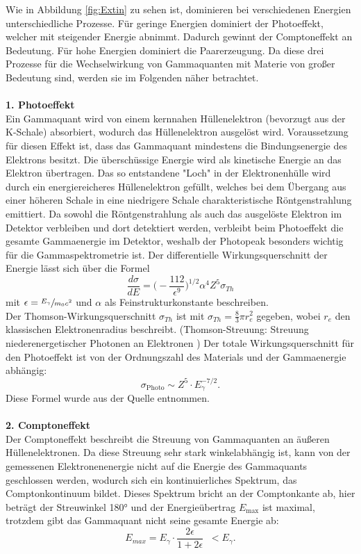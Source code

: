 Wie in Abbildung \ref{fig:Extin} zu sehen ist, dominieren bei verschiedenen Energien
unterschiedliche Prozesse. Für geringe Energien dominiert der Photoeffekt, welcher mit
steigender Energie abnimmt. Dadurch gewinnt der Comptoneffekt an Bedeutung. Für hohe
Energien dominiert die Paarerzeugung.
Da diese drei Prozesse für die Wechselwirkung von Gammaquanten mit Materie von großer Bedeutung sind,
werden sie im Folgenden näher betrachtet.
\\
\\
\textbf{1. Photoeffekt}\\
Ein Gammaquant wird von einem kernnahen Hüllenelektron (bevorzugt aus der K-Schale) absorbiert,
wodurch das Hüllenelektron ausgelöst wird. Voraussetzung für diesen Effekt ist, dass das Gammaquant
mindestens die Bindungsenergie des Elektrons besitzt. Die überschüssige Energie wird als kinetische
Energie an das Elektron übertragen.
Das so entstandene "Loch" in der Elektronenhülle wird durch ein energiereicheres Hüllenelektron
gefüllt, welches bei dem Übergang aus einer höheren Schale in eine niedrigere Schale
charakteristische Röntgenstrahlung emittiert.
Da sowohl die Röntgenstrahlung als auch das ausgelöste Elektron im Detektor verbleiben und
dort detektiert werden, verbleibt beim Photoeffekt die gesamte Gammaenergie im Detektor, weshalb
der Photopeak besonders wichtig für die Gammaspektrometrie ist.
Der differentielle Wirkungsquerschnitt der Energie lässt sich über die Formel
\begin{equation}
  \frac{d \sigma}{d E} = \bigg(-\frac{112}{\epsilon^{9}}\bigg)^{1/2}\alpha^4 Z^5\sigma_{Th}
  \label{eqn:diffPhoto}
\end{equation}
mit $\epsilon=\sfrac{E_{\gamma}}{m_0 c^2}$ und $\alpha$ als Feinstrukturkonstante
beschreiben. \\
Der Thomson-Wirkungsquerschnitt $\sigma_{Th}$ ist mit
$\sigma_{Th} = \frac{8}{3}\pi r_{e}^2$ gegeben, wobei $r_e$ den klassischen Elektronenradius beschreibt.
(Thomson-Streuung: Streuung niederenergetischer Photonen an Elektronen \cite{Springer3})
Der totale Wirkungsquerschnitt für den Photoeffekt ist von der Ordnungszahl des Materials
und der Gammaenergie abhängig:
\begin{equation}
  \sigma_{\text{Photo}}\sim Z^5\cdot E_{\gamma}^{-7/2}.
  \label{eqn:WQphoto}
\end{equation}
Diese Formel wurde aus der Quelle \cite{Karlsruhe} entnommen.
\\
\\
\textbf{2. Comptoneffekt}\\
Der Comptoneffekt beschreibt die Streuung von Gammaquanten an äußeren Hüllenelektronen. Da
diese Streuung sehr stark winkelabhängig ist, kann von der gemessenen Elektronenenergie
nicht auf die Energie des Gammaquants geschlossen werden, wodurch sich ein kontinuierliches
Spektrum, das Comptonkontinuum bildet. Dieses Spektrum bricht an der Comptonkante ab, hier
beträgt der Streuwinkel 180° und der Energieübertrag $E_{\text{max}}$ ist maximal, trotzdem gibt das
Gammaquant nicht seine gesamte Energie ab:
\begin{equation}
  E_{max}=E_{\gamma}\cdot\frac{2\epsilon}{1+2\epsilon}\;\;<E_{\gamma}.
  \label{eqn:kante}
\end{equation}


